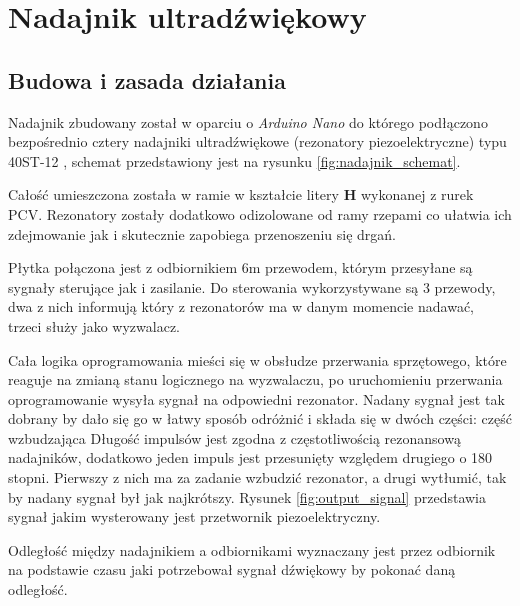 \chapter{Nadajnik ultradźwiękowy}
\section{Budowa i zasada działania}

Nadajnik zbudowany został w oparciu o \textit{Arduino Nano} \cite{bib:arduinoNano} do którego podłączono 
bezpośrednio cztery nadajniki ultradźwiękowe (rezonatory piezoelektryczne) typu 40ST-12 \cite{bib:40ST12}, schemat 
przedstawiony jest na rysunku \ref{fig:nadajnik_schemat}.



Całość umieszczona została w ramie w kształcie litery \textbf{H} wykonanej z rurek PCV.
Rezonatory zostały dodatkowo odizolowane od ramy rzepami co ułatwia ich zdejmowanie jak i skutecznie
zapobiega przenoszeniu się drgań.



Płytka połączona jest z odbiornikiem 6m przewodem, którym przesyłane są sygnały sterujące jak i zasilanie.
Do sterowania wykorzystywane są 3 przewody, dwa z nich informują który z rezonatorów ma w danym momencie nadawać,
trzeci służy jako wyzwalacz.

Cała logika oprogramowania mieści się w obsłudze przerwania sprzętowego, które reaguje na zmianą stanu logicznego
na wyzwalaczu,
po uruchomieniu przerwania oprogramowanie wysyła sygnał na odpowiedni rezonator. 
Nadany sygnał jest tak dobrany by dało się go w łatwy sposób odróżnić i składa się w dwóch
części: część wzbudzająca 
Długość impulsów jest zgodna z częstotliwością rezonansową nadajników, dodatkowo jeden
impuls jest przesunięty względem drugiego o 180 stopni. Pierwszy z nich ma za zadanie wzbudzić rezonator, a drugi wytłumić, 
tak by nadany sygnał był jak najkrótszy. 
Rysunek \ref{fig:output_signal} przedstawia sygnał jakim wysterowany jest przetwornik piezoelektryczny. 

Odległość między nadajnikiem a odbiornikami wyznaczany jest przez odbiornik na podstawie
czasu jaki potrzebował sygnał dźwiękowy by pokonać daną odległość.

